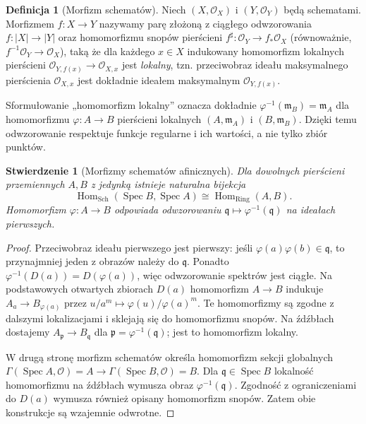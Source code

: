 \documentclass[11pt,a4paper,openany]{report}
\numberwithin{equation}{section}
\theoremstyle{plain}
\newtheorem{stwierdzenie}[twierdzenie]{Stwierdzenie}
\theoremstyle{definition}
\newtheorem{definicja}[twierdzenie]{Definicja}
\theoremstyle{remark}
\newcommand{\Spec}{\operatorname{Spec}}
\begin{document}
\begin{definicja}[Morfizm schematów]
\label{def:ga5-morfizm}
Niech $(X,\mathcal O_X)$ i $(Y,\mathcal O_Y)$ będą schematami.
Morfizmem $f:X\to Y$ nazywamy parę złożoną z ciągłego odwzorowania
$f:|X|\to|Y|$ oraz homomorfizmu snopów pierścieni
$f^\sharp:\mathcal O_Y\to f_*\mathcal O_X$ (równoważnie,
$f^{-1}\mathcal O_Y\to\mathcal O_X$), taką że dla każdego $x\in X$
indukowany homomorfizm lokalnych pierścieni
$\mathcal O_{Y,f(x)}\to\mathcal O_{X,x}$ jest \emph{lokalny}, tzn.
przeciwobraz ideału maksymalnego pierścienia $\mathcal O_{X,x}$
jest dokładnie ideałem maksymalnym $\mathcal O_{Y,f(x)}$.
\end{definicja}

Sformułowanie „homomorfizm lokalny” oznacza dokładnie
$\varphi^{-1}(\mathfrak m_B)=\mathfrak m_A$ dla homomorfizmu
$\varphi:A\to B$ pierścieni lokalnych $(A,\mathfrak m_A)$ i
$(B,\mathfrak m_B)$. Dzięki temu odwzorowanie respektuje funkcje
regularne i ich wartości, a nie tylko zbiór punktów.

\begin{stwierdzenie}[Morfizmy schematów afinicznych]
\label{st:ga5-affine-morphism}
Dla dowolnych pierścieni przemiennych $A,B$ z jedynką istnieje
naturalna bijekcja
\[
 \operatorname{Hom}_{\mathrm{Sch}}(\Spec B,\Spec A)
 \cong\operatorname{Hom}_{\mathrm{Ring}}(A,B).
\]
Homomorfizm $\varphi:A\to B$ odpowiada odwzorowaniu
$\mathfrak q\mapsto\varphi^{-1}(\mathfrak q)$ na ideałach pierwszych.
\end{stwierdzenie}
\begin{proof}
Przeciwobraz ideału pierwszego jest pierwszy: jeśli
$\varphi(a)\varphi(b)\in\mathfrak q$, to przynajmniej jeden
z obrazów należy do $\mathfrak q$. Ponadto
$\varphi^{-1}(D(a))=D(\varphi(a))$, więc odwzorowanie spektrów
jest ciągłe. Na podstawowych otwartych zbiorach $D(a)$
homomorfizm $A\to B$ indukuje
$A_a\to B_{\varphi(a)}$ przez $u/a^m\mapsto\varphi(u)/\varphi(a)^m$.
Te homomorfizmy są zgodne z dalszymi lokalizacjami i sklejają się
do homomorfizmu snopów. Na źdźbłach dostajemy
$A_{\mathfrak p}\to B_{\mathfrak q}$ dla
$\mathfrak p=\varphi^{-1}(\mathfrak q)$; jest to homomorfizm lokalny.

W drugą stronę morfizm schematów określa homomorfizm sekcji
globalnych $\Gamma(\Spec A,\mathcal O)=A\to
\Gamma(\Spec B,\mathcal O)=B$. Dla $\mathfrak q\in\Spec B$
lokalność homomorfizmu na źdźbłach wymusza obraz
$\varphi^{-1}(\mathfrak q)$. Zgodność z ograniczeniami do
$D(a)$ wymusza również opisany homomorfizm snopów.
Zatem obie konstrukcje są wzajemnie odwrotne.
\end{proof}
\end{document}
